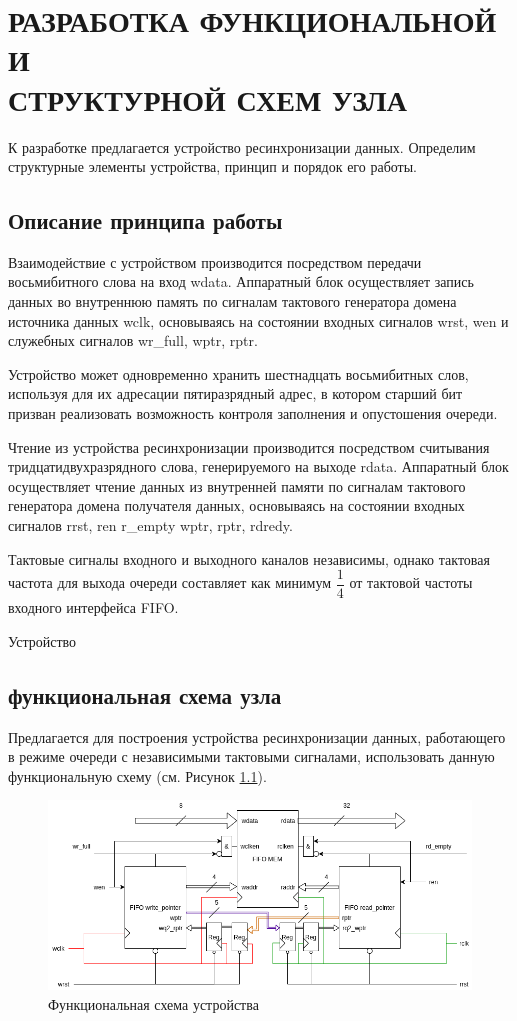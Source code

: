 \newcommand{\erdatamodaler}{ERwin Data Modeler~}

\chapter{РАЗРАБОТКА ФУНКЦИОНАЛЬНОЙ И \\СТРУКТУРНОЙ СХЕМ УЗЛА}

К разработке предлагается устройство ресинхронизации данных. Определим структурные элементы устройства, принцип и порядок его работы.

\section{Описание принципа работы}
Взаимодействие с устройством производится посредством передачи восьмибитного слова на вход wdata. Аппаратный блок осуществляет запись данных во внутреннюю память по сигналам тактового генератора домена источника данных wclk, основываясь на состоянии входных сигналов wrst, wen и служебных сигналов wr\_full,  wptr, rptr.

Устройство может одновременно хранить шестнадцать восьмибитных слов, используя для их адресации пятиразрядный адрес, в котором старший бит призван реализовать возможность контроля заполнения и опустошения очереди.

Чтение из устройства ресинхронизации производится посредством считывания тридцатидвухразрядного слова, генерируемого на выходе rdata. Аппаратный блок осуществляет чтение данных из внутренней памяти по сигналам тактового генератора домена получателя данных, основываясь на состоянии входных сигналов rrst, ren  r\_empty wptr, rptr, rdredy.

Тактовые сигналы входного и выходного каналов независимы, однако тактовая частота для выхода очереди составляет как минимум   $\dfrac14$ от тактовой частоты входного интерфейса FIFO.

Устройство 


\section{функциональная схема узла}
Предлагается для построения устройства ресинхронизации данных, работающего в режиме очереди с независимыми тактовыми сигналами, использовать данную функциональную схему (см. Рисунок \ref{fig:unit-design}).

\begin{figure}
	\centering
	\includegraphics[width=1\linewidth]{course-scheme/images/unit-design}
	\caption{Функциональная схема устройства}
	\label{fig:unit-design}
\end{figure}


